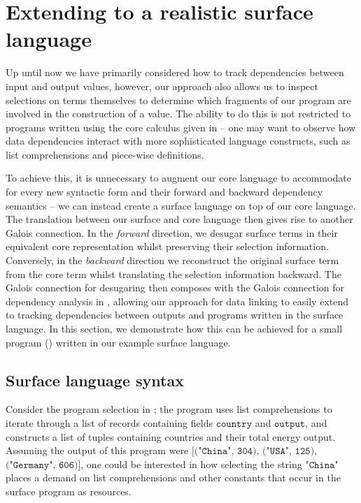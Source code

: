 \newpage
\section{Extending to a realistic surface language}
\label{sec:surface-language}

Up until now we have primarily considered how to track dependencies between input and output values, however, our approach also allows us to inspect selections on terms themselves to determine which fragments of our program are involved in the construction of a value. The ability to do this is not restricted to programs written using the core calculus given in  -- one may want to observe how data dependencies interact with more sophisticated language constructs, such as list comprehensions and piece-wise definitions.

To achieve this, it is unnecessary to augment our core language to accommodate for every new syntactic form and their forward and backward dependency semantics -- we can instead create a surface language on top of our core language. The translation between our surface and core language then gives rise to another Galois connection. In the \textit{forward} direction, we desugar surface terms in their equivalent core representation whilst preserving their selection information. Conversely, in the \textit{backward} direction we reconstruct the original surface term from the core term whilst translating the selection information backward. The Galois connection for desugaring then composes with the Galois connection for dependency analysis in , allowing our approach for data linking to easily extend to tracking dependencies between outputs and programs written in the surface language. In this section, we demonstrate how this can be achieved for a small program () written in our example surface language.



\subsection{Surface language syntax}

Consider the program selection in ; the program uses list comprehensions to iterate through a list of records containing fields $\texttt{country}$ and $\texttt{output}$, and constructs a list of tuples containing countries and their total energy output. Assuming the output of this program were $\texttt{[("China", 304), ("USA", 125),}$ $\texttt{("Germany", 606)]}$, one could be interested in how selecting the string $\texttt{"China"}$ places a demand on list comprehensions and other constants that occur in the surface program as resources.

